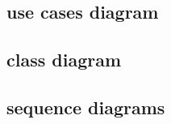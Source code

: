 \documentclass[../main.tex]{subfiles}
\begin{document}
	\subsection{use cases diagram}
	\subsection{class diagram}
	\subsection{sequence diagrams}
\end{document}
